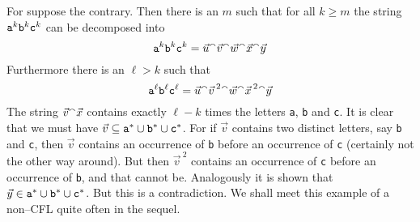 For suppose the contrary. Then there is an $m$ such that
for all $k \geq m$ the string $\mbox{\tt a}^k \mbox{\tt b}^k \mbox{\tt c}^k$
can be decomposed into
\begin{equation}
\mbox{\tt a}^k \mbox{\tt b}^k \mbox{\tt c}^k
= \vec{u} {^{\smallfrown}} \vec{v} {^{\smallfrown}} \vec{w} {^{\smallfrown}} \vec{x}
{^{\smallfrown}} \vec{y}
\end{equation}
Furthermore there is an $\ell > k$ such that
\begin{equation}
\mbox{\tt a}^{\ell} \mbox{\tt b}^{\ell} \mbox{\tt c}^{\ell} =
\vec{u} {^{\smallfrown}} {\vec{v}\,}^2 {^{\smallfrown}} \vec{w} {^{\smallfrown}} {\vec{x}\,}^2 {^{\smallfrown}}
\vec{y}
\end{equation}
The string $\vec{v} {^{\smallfrown}} \vec{x}$ contains exactly $\ell - k$ times
the letters {\tt a}, {\tt b} and {\tt c}. It is clear that we must
have $\vec{v} \subseteq \mbox{\tt a}^{\ast} \cup
\mbox{\tt b}^{\ast} \cup \mbox{\tt c}^{\ast}$.
For if $\vec{v}$ contains two distinct letters, say
{\tt b} and {\tt c}, then $\vec{v}$ contains an occurrence
of {\tt b} before an occurrence of {\tt c} (certainly not the
other way around). But then ${\vec{v}\,}^2$ contains
an occurrence of {\tt c} before an occurrence of {\tt b},
and that cannot be. Analogously it is shown that
$\vec{y} \in \mbox{\tt a}^{\ast} \cup \mbox{\tt b}^{\ast}
\cup \mbox{\tt c}^{\ast}$. But this is a contradiction.
We shall meet this example of a non--CFL quite often in the 
sequel.

